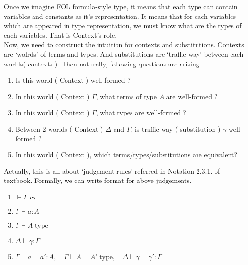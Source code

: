 \documentclass[12pt, a4paper, openany, twoside]{book}
\theoremstyle{definition}
\theoremstyle{remark}
\theoremstyle{plain}
\numberwithin{equation}{section}
\begin{document}
Once we imagine FOL formula-style type, it means that each type can contain variables and constants as it's representation. 
It means that for each variables which are appeared in type representation, we must know what are the types of each variables.
That is Context's role. \\

Now, we need to construct the intuition for contexts and substitutions. Contexts are \lq wolrds' of terms and types. 
And substitutions are \lq traffic way' between each worlds( contexts ). Then naturally, following questions are arising. 
\begin{tcolorbox}[colback=yellow!10!white,colframe=red!75!black,title=Questions]
    \begin{enumerate}
        \item Is this world ( Context ) well-formed ?
        \item In this world ( Context ) $\Gamma$, what terms of type $A$ are well-formed ? 
        \item In this world ( Context ) $\Gamma$, what types are well-formed ? 
        \item Between 2 worlds ( Context ) $\Delta$ and $\Gamma$, is traffic way ( substitution ) $\gamma$ well-formed ?
        \item In this world ( Context ), which terms/types/substitutions are equivalent? 
    \end{enumerate}
\end{tcolorbox}

Actually, this is all about \lq judgement rules' referred in Notation 2.3.1. of textbook. 
Formally, we can write format for above judgements. 

\begin{tcolorbox}[colback=yellow!10!white,colframe=red!75!black,title=Formal Representations for Judgements]
    \begin{enumerate}
        \item $\vdash \Gamma \text{ cx}$
        \item $\Gamma \vdash a : A$
        \item $\Gamma \vdash A \text{ type}$
        \item $\Delta \vdash \gamma : \Gamma$
        \item $\Gamma \vdash a = a' : A, \quad \Gamma \vdash A = A' \text{ type}, \quad \Delta \vdash \gamma = \gamma' : \Gamma$ 
    \end{enumerate}
\end{tcolorbox}
\end{document}
